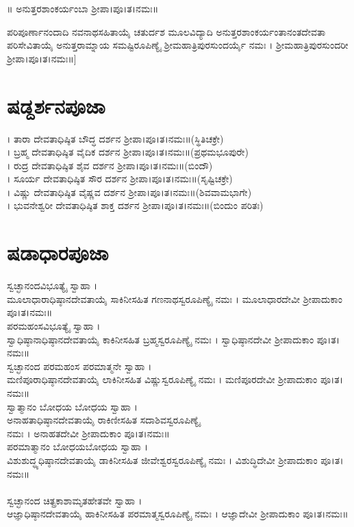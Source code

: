 ॥ ಅನುತ್ತರಶಾಂಕರ್ಯಂಬಾ ಶ್ರೀಪಾ।ಪೂ।ತ।ನಮಃ॥

ಪರಿಪೂರ್ಣಾನಂದಾದಿ ನವನಾಥಸಹಿತಾಯೈ ಚತುರ್ದಶ ಮೂಲವಿದ್ಯಾದಿ ಅನುತ್ತರಶಾಂಕರ್ಯಂತಾನಂತದೇವತಾ ಪರಿಸೇವಿತಾಯೈ  ಅನುತ್ತರಾಮ್ನಾಯ ಸಮಷ್ಟಿರೂಪಿಣ್ಯೈ ಶ್ರೀಮಹಾತ್ರಿಪುರಸುಂದರ್ಯೈ ನಮಃ । ಶ್ರೀಮಹಾತ್ರಿಪುರಸುಂದರೀ ಶ್ರೀಪಾ।ಪೂ।ತ।ನಮಃ॥]\,

\section{ಷಡ್ದರ್ಶನಪೂಜಾ}
। ತಾರಾ ದೇವತಾಧಿಷ್ಠಿತ ಬೌದ್ಧ ದರ್ಶನ ಶ್ರೀಪಾ।ಪೂ।ತ।ನಮಃ॥(ಸ್ಥಿತಿಚಕ್ರೇ)\\
। ಬ್ರಹ್ಮ ದೇವತಾಧಿಷ್ಠಿತ ವೈದಿಕ ದರ್ಶನ ಶ್ರೀಪಾ।ಪೂ।ತ।ನಮಃ॥(ಪ್ರಥಮಭೂಪುರೇ)\\
 । ರುದ್ರ ದೇವತಾಧಿಷ್ಠಿತ ಶೈವ ದರ್ಶನ ಶ್ರೀಪಾ।ಪೂ।ತ।ನಮಃ॥(ಬಿಂದೌ)\\
। ಸೂರ್ಯ ದೇವತಾಧಿಷ್ಠಿತ ಸೌರ ದರ್ಶನ ಶ್ರೀಪಾ।ಪೂ।ತ।ನಮಃ॥(ಸೃಷ್ಟಿಚಕ್ರೇ)\\
। ವಿಷ್ಣು ದೇವತಾಧಿಷ್ಠಿತ ವೈಷ್ಣವ ದರ್ಶನ ಶ್ರೀಪಾ।ಪೂ।ತ।ನಮಃ॥(ಶಿವವಾಮಭಾಗೇ)\\
। ಭುವನೇಶ್ವರೀ ದೇವತಾಧಿಷ್ಠಿತ ಶಾಕ್ತ ದರ್ಶನ ಶ್ರೀಪಾ।ಪೂ।ತ।ನಮಃ॥(ಬಿಂದುಂ ಪರಿತಃ)
\section{ಷಡಾಧಾರಪೂಜಾ}
 ಸ್ವಚ್ಛಾನಂದವಿಭೂತ್ಯೈ ಸ್ವಾಹಾ ।\\ ಮೂಲಾಧಾರಾಧಿಷ್ಠಾನದೇವತಾಯೈ ಸಾಕಿನೀಸಹಿತ ಗಣನಾಥಸ್ವರೂಪಿಣ್ಯೈ ನಮಃ ।  ಮೂಲಾಧಾರದೇವೀ ಶ್ರೀಪಾದುಕಾಂ ಪೂ।ತ।ನಮಃ॥\\
 ಪರಮಹಂಸವಿಭೂತ್ಯೈ ಸ್ವಾಹಾ ।\\ ಸ್ವಾಧಿಷ್ಠಾನಾಧಿಷ್ಠಾನದೇವತಾಯೈ  ಕಾಕಿನೀಸಹಿತ  ಬ್ರಹ್ಮಸ್ವರೂಪಿಣ್ಯೈ ನಮಃ । ಸ್ವಾಧಿಷ್ಠಾನದೇವೀ ಶ್ರೀಪಾದುಕಾಂ ಪೂ।ತ।ನಮಃ॥\\
ಸ್ವಚ್ಛಾನಂದ ಪರಮಹಂಸ ಪರಮಾತ್ಮನೇ ಸ್ವಾಹಾ ।\\ ಮಣಿಪೂರಾಧಿಷ್ಠಾನದೇವತಾಯೈ ಲಾಕಿನೀಸಹಿತ ವಿಷ್ಣುಸ್ವರೂಪಿಣ್ಯೈ ನಮಃ । ಮಣಿಪೂರದೇವೀ ಶ್ರೀಪಾದುಕಾಂ ಪೂ।ತ।ನಮಃ॥\\
 ಸ್ವಾತ್ಮಾನಂ ಬೋಧಯ ಬೋಧಯ ಸ್ವಾಹಾ ।\\ ಅನಾಹತಾಧಿಷ್ಠಾನದೇವತಾಯೈ ರಾಕಿಣೀಸಹಿತ ಸದಾಶಿವಸ್ವರೂಪಿಣ್ಯೈ\\ ನಮಃ । ಅನಾಹತದೇವೀ ಶ್ರೀಪಾದುಕಾಂ ಪೂ।ತ।ನಮಃ॥\\
ಪರಮಾತ್ಮಾನಂ ಬೋಧಯಬೋಧಯ ಸ್ವಾಹಾ ।\\ ವಿಶುಶುದ್ಧ್ಯಧಿಷ್ಠಾನದೇವತಾಯೈ ಡಾಕಿನೀಸಹಿತ ಜೀವೇಶ್ವರಸ್ವರೂಪಿಣ್ಯೈ ನಮಃ । ವಿಶುದ್ಧಿದೇವೀ ಶ್ರೀಪಾದುಕಾಂ ಪೂ।ತ।ನಮಃ॥\\
\\ ಸ್ವಚ್ಛಾನಂದ ಚಿತ್ಪ್ರಕಾಶಾಮೃತಹೇತವೇ ಸ್ವಾಹಾ ।\\ ಆಜ್ಞಾಧಿಷ್ಠಾನದೇವತಾಯೈ ಹಾಕಿನೀಸಹಿತ ಪರಮಾತ್ಮಸ್ವರೂಪಿಣ್ಯೈ ನಮಃ । ಆಜ್ಞಾದೇವೀ ಶ್ರೀಪಾದುಕಾಂ ಪೂ।ತ।ನಮಃ॥
